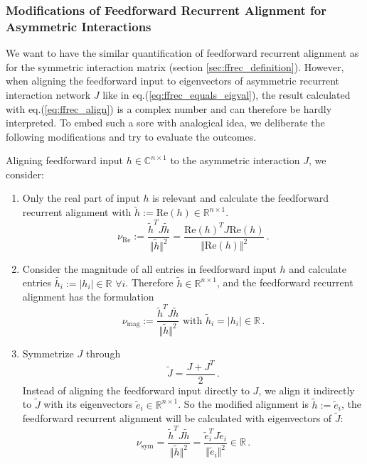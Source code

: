 \documentclass[11pt]{article}
\begin{document}
{	\subsubsection{Modifications of Feedforward Recurrent Alignment for Asymmetric Interactions} \label{sec:modify_ffrec_alignment_score}
	We want to have the similar quantification of feedforward recurrent alignment as for the symmetric interaction matrix (section \ref{sec:ffrec_definition}). However, when aligning the feedforward input to eigenvectors of asymmetric recurrent interaction network $J$ like in eq.(\ref{eq:ffrec_equals_eigval}), the result calculated with eq.(\ref{eq:ffrec_align}) is a complex number and can therefore be hardly interpreted. To embed such a sore with analogical idea, we deliberate the following modifications and try to evaluate the outcomes. 
	
	Aligning feedforward input $h \in \mathbb{C}^{n \times 1}$ to the asymmetric interaction $J$, we consider:
		\begin{enumerate}
			\item \label{sec:modicication_real_part} Only the real part of input $h$ is relevant and calculate the feedforward recurrent alignment with $\tilde{h} := \text{Re}(h) \in \mathbb{R}^{n \times 1}$.
				\begin{equation} \label{eq:ffrec_real_part}
					\nu_{\text{Re}} := \frac{\tilde{h}^T J \tilde{h}}{\Vert \tilde{h} \Vert^2} = \frac{\text{Re}(h)^T J \text{Re}(h)}{\Vert \text{Re}(h)\Vert^2} \, .
				\end{equation}
			\item \label{sec:modification_magnitude} Consider the magnitude of all entries in feedforward input $h$ and calculate entries $\tilde{h_i} := \vert h_i \vert \in \mathbb{R} \, \, \forall i$. Therefore $\tilde{h} \in \mathbb{R}^{n \times 1}$, and the feedforward recurrent alignment has the formulation
				\begin{equation} \label{eq:ffrec_mag}
					\nu_{\text{mag}} := \frac{\tilde{h}^T J \tilde{h}}{\Vert \tilde{h} \Vert^2} \text{ with } \tilde{h}_i = \vert h_i \vert \in \mathbb{R} \, .
				\end{equation}
			\item \label{sec:modification_symmetrized} Symmetrize $J$ through
				\begin{equation} \label{eq:symmetrized_J}
					\tilde{J} = \frac{J + J^T}{2} \, .
				\end{equation}
				Instead of aligning the feedforward input directly to $J$, we align it indirectly to $\tilde{J}$ with its eigenvectors $\tilde{e}_i \in \mathbb{R}^{n \times 1}$. So the modified alignment is $\tilde{h} := \tilde{e}_i $, the feedforward recurrent alignment will be calculated with eigenvectors of $\tilde{J}$:
				\begin{equation} \label{eq:ffrec_symmetrized}
					\nu_{\text{sym}} =  \frac{\tilde{h}^T J \tilde{h}}{\Vert \tilde{h} \Vert^2} = \frac{\tilde{e}_i^T J \tilde{e}_i}{\Vert \tilde{e}_i \Vert^2} \in \mathbb{R} \, .
				\end{equation}
		\end{enumerate}
	
}
\end{document}
